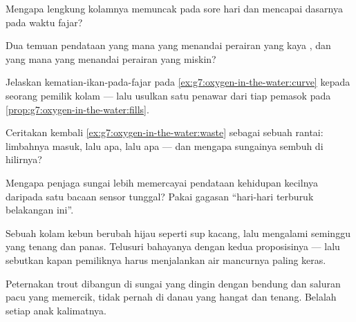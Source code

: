 \begin{exercise}[$\star$]\label{exo:g7:oxygen-in-the-water:5}
Mengapa lengkung  kolamnya memuncak pada sore hari dan mencapai
dasarnya pada waktu fajar?
\end{exercise}

\begin{exercise}[$\star$]\label{exo:g7:oxygen-in-the-water:6}
Dua temuan pendataan yang mana yang menandai perairan yang kaya
, dan yang mana yang menandai perairan yang miskin?
\end{exercise}

\begin{exercise}[$\star\star$]\label{exo:g7:oxygen-in-the-water:7}
Jelaskan kematian-ikan-pada-fajar pada
\cref{ex:g7:oxygen-in-the-water:curve} kepada seorang pemilik kolam
--- lalu usulkan satu penawar dari tiap pemasok pada
\cref{prop:g7:oxygen-in-the-water:fills}.
\end{exercise}

\begin{exercise}[$\star\star$]\label{exo:g7:oxygen-in-the-water:8}
Ceritakan kembali \cref{ex:g7:oxygen-in-the-water:waste} sebagai
sebuah rantai: limbahnya masuk, lalu apa, lalu apa --- dan mengapa
sungainya sembuh di hilirnya?
\end{exercise}

\begin{exercise}[$\star\star$]\label{exo:g7:oxygen-in-the-water:9}
Mengapa penjaga sungai lebih memercayai pendataan kehidupan kecilnya
daripada satu bacaan sensor tunggal? Pakai gagasan ``hari-hari
terburuk belakangan ini''.
\end{exercise}

\begin{exercise}[$\star\star$]\label{exo:g7:oxygen-in-the-water:10}
Sebuah kolam kebun berubah hijau seperti sup kacang, lalu mengalami
seminggu yang tenang dan panas. Telusuri bahayanya dengan kedua
proposisinya --- lalu sebutkan kapan pemiliknya harus menjalankan air
mancurnya paling keras.
\end{exercise}

\begin{exercise}[$\star\star$]\label{exo:g7:oxygen-in-the-water:11}
Peternakan  trout dibangun di sungai yang dingin dengan bendung
dan saluran pacu yang memercik, tidak pernah di danau yang hangat dan
tenang. Belalah setiap anak kalimatnya.
\end{exercise}

